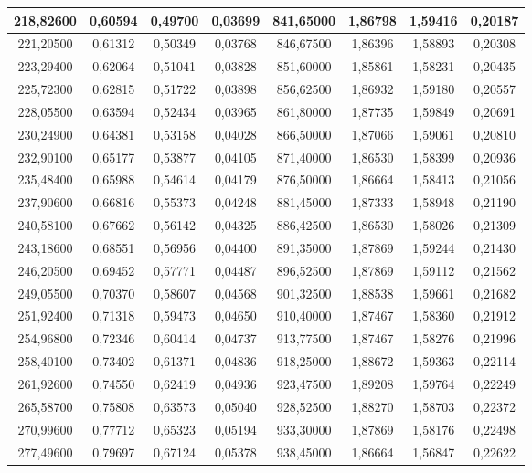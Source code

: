 \documentclass[a4paper,12pt]{article}
\numberwithin{equation}{section}
\begin{document}
\begin{appendices}
\begin{longtable}[c]{|c|c|c|c|c|c|c|c|}
218,82600	&	0,60594	&	0,49700	&	0,03699	&	841,65000	&	1,86798	&	1,59416	&	0,20187	\\\hline
221,20500	&	0,61312	&	0,50349	&	0,03768	&	846,67500	&	1,86396	&	1,58893	&	0,20308	\\\hline
223,29400	&	0,62064	&	0,51041	&	0,03828	&	851,60000	&	1,85861	&	1,58231	&	0,20435	\\\hline
225,72300	&	0,62815	&	0,51722	&	0,03898	&	856,62500	&	1,86932	&	1,59180	&	0,20557	\\\hline
228,05500	&	0,63594	&	0,52434	&	0,03965	&	861,80000	&	1,87735	&	1,59849	&	0,20691	\\\hline
230,24900	&	0,64381	&	0,53158	&	0,04028	&	866,50000	&	1,87066	&	1,59061	&	0,20810	\\\hline
232,90100	&	0,65177	&	0,53877	&	0,04105	&	871,40000	&	1,86530	&	1,58399	&	0,20936	\\\hline
235,48400	&	0,65988	&	0,54614	&	0,04179	&	876,50000	&	1,86664	&	1,58413	&	0,21056	\\\hline
237,90600	&	0,66816	&	0,55373	&	0,04248	&	881,45000	&	1,87333	&	1,58948	&	0,21190	\\\hline
240,58100	&	0,67662	&	0,56142	&	0,04325	&	886,42500	&	1,86530	&	1,58026	&	0,21309	\\\hline
243,18600	&	0,68551	&	0,56956	&	0,04400	&	891,35000	&	1,87869	&	1,59244	&	0,21430	\\\hline
246,20500	&	0,69452	&	0,57771	&	0,04487	&	896,52500	&	1,87869	&	1,59112	&	0,21562	\\\hline
249,05500	&	0,70370	&	0,58607	&	0,04568	&	901,32500	&	1,88538	&	1,59661	&	0,21682	\\\hline
251,92400	&	0,71318	&	0,59473	&	0,04650	&	910,40000	&	1,87467	&	1,58360	&	0,21912	\\\hline
254,96800	&	0,72346	&	0,60414	&	0,04737	&	913,77500	&	1,87467	&	1,58276	&	0,21996	\\\hline
258,40100	&	0,73402	&	0,61371	&	0,04836	&	918,25000	&	1,88672	&	1,59363	&	0,22114	\\\hline
261,92600	&	0,74550	&	0,62419	&	0,04936	&	923,47500	&	1,89208	&	1,59764	&	0,22249	\\\hline
265,58700	&	0,75808	&	0,63573	&	0,05040	&	928,52500	&	1,88270	&	1,58703	&	0,22372	\\\hline
270,99600	&	0,77712	&	0,65323	&	0,05194	&	933,30000	&	1,87869	&	1,58176	&	0,22498	\\\hline
277,49600	&	0,79697	&	0,67124	&	0,05378	&	938,45000	&	1,86664	&	1,56847	&	0,22622	\\\hline

\end{longtable}
\end{appendices}
\end{document}
